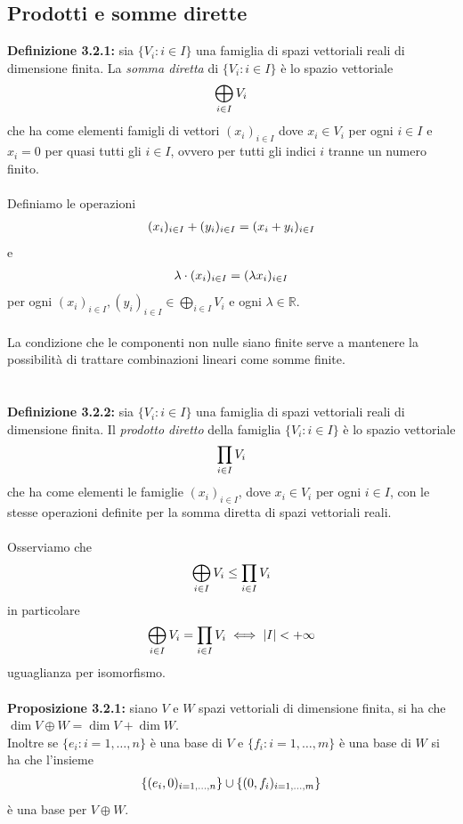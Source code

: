 \documentclass{article}
\begin{document}
\newpage
\subsection{Prodotti e somme dirette}
\textbf{Definizione 3.2.1:} sia $\{ V_i : i \in I \}$ una famiglia di spazi vettoriali reali di dimensione finita. La \textit{somma diretta} di $\{ V_i : i \in I \}$ è lo spazio vettoriale
\begin{gather}
    \bigoplus_{i \in I} V_i \notag
\end{gather}
che ha come elementi famigli di vettori $(x_i)_{i \in I}$ dove $x_i \in V_i$ per ogni $i \in I$ e $x_i = 0$ per quasi tutti gli $i \in I$, ovvero per tutti gli indici $i$ tranne un numero finito. \\ \\
Definiamo le operazioni
\begin{gather}
    (x_i)_{i \in I} + (y_i)_{i \in I} = (x_i + y_i)_{i \in I} \notag
\end{gather}
e
\begin{gather}
    \lambda \cdot (x_i)_{i \in I} = (\lambda x_i)_{i \in I} \notag
\end{gather}
per ogni $(x_i)_{i \in I}, (y_i)_{i \in I} \in \bigoplus_{i \in I} V_i$ e ogni $\lambda \in \mathbb{R}$. \\ \\
La condizione che le componenti non nulle siano finite serve a mantenere la possibilità di trattare combinazioni lineari come somme finite. \\ \\ \\
\textbf{Definizione 3.2.2:} sia $\{ V_i : i \in I \}$ una famiglia di spazi vettoriali reali di dimensione finita. Il \textit{prodotto diretto} della famiglia $\{ V_i : i \in I \}$ è lo spazio vettoriale
\begin{gather}
    \prod_{i \in I} V_i \notag
\end{gather}
che ha come elementi le famiglie $(x_i)_{i \in I}$, dove $x_i \in V_i$ per ogni $i \in I$, con le stesse operazioni definite per la somma diretta di spazi vettoriali reali. \\ \\
Osserviamo che
\begin{gather}
    \bigoplus_{i \in I} V_i \leq \prod_{i \in I} V_i \notag
\end{gather}
in particolare
\begin{gather}
    \bigoplus_{i \in I} V_i = \prod_{i \in I} V_i \iff |I| < +\infty \notag
\end{gather}
uguaglianza per isomorfismo. \\ \\
\textbf{Proposizione 3.2.1:} siano $V$ e $W$ spazi vettoriali di dimensione finita, si ha che $\dim V \oplus W = \dim V + \dim W$. \\
Inoltre se $\{ e_i : i = 1, \dots, n \}$ è una base di $V$ e $\{ f_i : i = 1, \dots, m \}$ è una base di $W$ si ha che l'insieme
\begin{gather}
    \{ (e_i, 0)_{i = 1, \dots, n} \} \cup \{ (0, f_i)_{i = 1, \dots, m} \} \notag
\end{gather}
è una base per $V \oplus W$. \\
\end{document}
